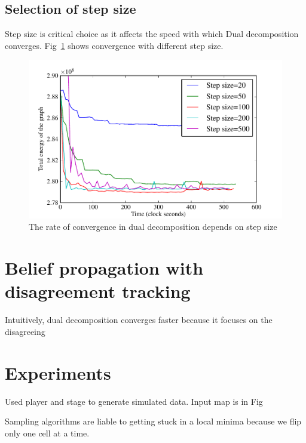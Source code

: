 \documentclass[letterpaper, 10 pt, conference]{ieeeconf} %
\begin{document}
\subsection{Selection of step size}
Step size is critical choice as it affects the speed with which Dual decomposition converges. Fig~\ref{fig:dualdecomposition-stepsize} shows convergence with different step size.
\begin{figure}
  \includegraphics[width=\columnwidth]{../figures/dualdecomposition-stepsize-inc500.pdf}
  \caption{The rate of convergence in dual decomposition depends on step size}
  \label{fig:dualdecomposition-stepsize}
\end{figure}
\section{Belief propagation with disagreement tracking}
Intuitively, dual decomposition converges faster because it focuses on the disagreeing 

\section{Experiments} 
Used player and stage to generate simulated data. Input map is in Fig
\begin{figure}
\end{figure}
Sampling algorithms are liable to getting stuck in a local minima because we flip only one cell at a time.
\end{document}
